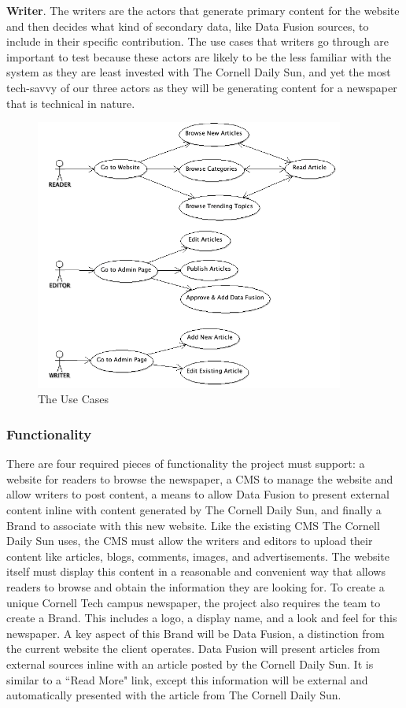 \documentclass[10pt]{article} %
\begin{document}
\textbf{Writer}. The writers are the actors that generate primary content for the website and then decides what kind of secondary data, like Data Fusion sources, to include in their specific contribution. The use cases that writers go through are important to test because these actors are likely to be the less familiar with the system as they are least invested with The Cornell Daily Sun, and yet the most tech-savvy of our three actors as they will be generating content for a newspaper that is technical in nature.


\begin{figure}[h]
\begin{center}
\includegraphics[width=4in]{images/use_case}
\end{center}
\caption{The Use Cases}
\end{figure}
                   
\subsubsection{Functionality}
                   
There are four required pieces of functionality the project must support: a website for readers to browse the newspaper, a CMS to manage the website and allow writers to post content, a means to allow Data Fusion to present external content inline with content generated by The Cornell Daily Sun, and finally a Brand to associate with this new website. Like the existing CMS The Cornell Daily Sun uses, the CMS must allow the writers and editors to upload their content like articles, blogs, comments, images, and advertisements. The website itself must display this content in a reasonable and convenient way that allows readers to browse and obtain the information they are looking for. To create a unique Cornell Tech campus newspaper, the project also requires the team to create a Brand. This includes a logo, a display name, and a look and feel for this newspaper. A key aspect of this Brand will be Data Fusion, a distinction from the current website the client operates. Data Fusion will present articles from external sources inline with an article posted by the Cornell Daily Sun. It is similar to a ``Read More" link, except this information will be external and automatically presented with the article from The Cornell Daily Sun.
                   
\end{document}
